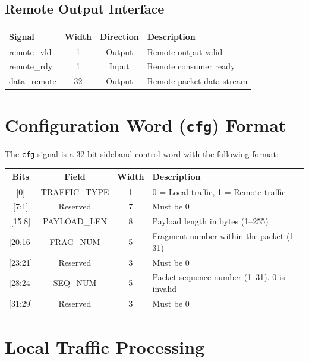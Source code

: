 \documentclass[11pt,a4paper]{article}
\begin{document}
\subsection{Remote Output Interface}

\begin{longtable}{|>{\ttfamily}p{3cm}|c|c|p{7cm}|}
\hline
Signal & Width & Direction & Description \\
\hline
remote\_vld & 1 & Output & Remote output valid \\
remote\_rdy & 1 & Input & Remote consumer ready \\
data\_remote & 32 & Output & Remote packet data stream \\
\hline
\end{longtable}

\section{Configuration Word (\texttt{cfg}) Format}

The \texttt{cfg} signal is a 32-bit sideband control word with the following format:

\begin{longtable}{|c|c|c|p{7cm}|}
\hline
Bits & Field & Width & Description \\
\hline
{[0]} & TRAFFIC\_TYPE & 1 & 0 = Local traffic, 1 = Remote traffic \\
{[7:1]} & Reserved & 7 & Must be 0 \\
{[15:8]} & PAYLOAD\_LEN & 8 & Payload length in bytes (1--255) \\
{[20:16]} & FRAG\_NUM & 5 & Fragment number within the packet (1--31) \\
{[23:21]} & Reserved & 3 & Must be 0 \\
{[28:24]} & SEQ\_NUM & 5 & Packet sequence number (1--31). 0 is invalid \\
{[31:29]} & Reserved & 3 & Must be 0 \\
\hline
\end{longtable}

\section{Local Traffic Processing}
\end{document}
